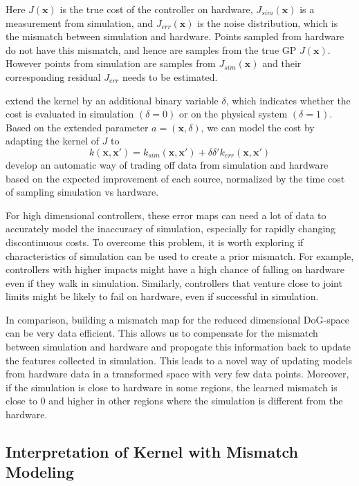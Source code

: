 Here $J(\pmb{x})$ is the true cost of the controller on hardware, $J_{sim}(\pmb{x})$ is a measurement from simulation, and $J_{err}(\pmb{x})$ is the noise distribution, which is the mismatch between simulation and hardware. Points sampled from hardware do not have this mismatch, and hence are samples from the true GP $J(\pmb{x})$. However points from simulation are samples from $J_{sim}(\pmb{x})$ and their corresponding residual $J_{err}$ needs to be estimated. 

\cite{poloczek2016multi} extend the kernel by an additional binary
variable $\delta$, which indicates whether the cost is evaluated in
simulation $(\delta = 0)$ or on the physical system $(\delta = 1)$. Based on the extended parameter $a = (\pmb{x}, \delta)$, we can model the cost
by adapting the kernel of $J$ to
\begin{equation}
    k(\pmb{x}, \pmb{x'}) = k_{sim}(\pmb{x}, \pmb{x'}) + \delta \delta' k_{err}(\pmb{x}, \pmb{x'})
\end{equation}
\cite{marco2017virtual} develop an automatic way of trading off data from simulation and hardware based on the expected improvement of each source, normalized by the time cost of sampling simulation vs hardware. 

For high dimensional controllers, these error maps can  need a lot of data to accurately model the inaccuracy of simulation, especially for rapidly changing discontinuous costs. To overcome this problem, it is worth exploring if characteristics of simulation can be used to create a prior mismatch. For example, controllers with higher impacts might have a high chance of falling on hardware even if they walk in simulation. Similarly, controllers that venture close to joint limits might be likely to fail on hardware, even if successful in simulation. 

In comparison, building a mismatch map for the reduced dimensional DoG-space can be very data efficient. This allows us to compensate for the mismatch between simulation and hardware and propogate this information back to update the features collected in simulation. This leads to a novel way of updating models from hardware data in a transformed space with very few data points. Moreover, if the simulation is close to hardware in some regions, the learned mismatch is close to 0 and higher in other regions where the simulation is different from the hardware.

\subsection{Interpretation of Kernel with Mismatch Modeling}

